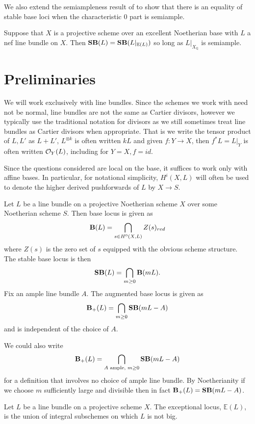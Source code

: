 We also extend the semiampleness result of \cite{witaszek2020keels} to show that there is an equality of stable base loci when the characteristic $0$ part is semiample.
 
 \begin{theorem}
 	Suppose that $X$ is a projective scheme over an excellent Noetherian base with $L$ a nef line bundle on $X$. Then $\SB(L)=\SB(L|_{\mathbb{E}(L)})$ so long as $L|_{X_{\mathbb{Q}}}$ is semiample.
 \end{theorem}


\section{Preliminaries}

We will work exclusively with line bundles. Since the schemes we work with need not be normal, line bundles are not the same as Cartier divisors, however we typically use the traditional notation for divisors as we still sometimes treat line bundles as Cartier divisors when appropriate. That is we write the tensor product of $L,L'$ as $L+L'$, $L^{\otimes k}$ is often written $kL$ and given $f:Y \to X$, then $f^{*}L=L|_{Y}$ is often written $\ox[Y](L)$, including for $Y=X, f=id$. 

Since the questions considered are local on the base, it suffices to work only with affine bases. In particular, for notational simplicity, $H^{i}(X,L)$ will often be used to denote the higher derived pushforwards of $L$ by $X \to S$. 
	
\begin{definition}
	Let $L$ be a line bundle on a projective Noetherian scheme $X$ over some Noetherian scheme $S$. Then base locus is given as 
	$$\BB(L)= \bigcap_{s \in H^{0}(X,L)} Z(s)_{red}$$
	where $Z(s)$ is the zero set of $s$ equipped with the obvious scheme structure. The stable base locus is then
	$$\SB(L)=\bigcap_{m \geq 0}\BB(mL).$$
	Fix an ample line bundle $A$. The augmented base locus is given as 
	$$\BS(L)=\bigcap_{m \geq 0}\SB(mL-A)$$
	and is independent of the choice of $A$.
\end{definition}

We could also write \[\BS(L)= \bigcap_{A \text{ ample, } m \geq 0}\SB(mL-A)\] for a definition that involves no choice of ample line bundle. By Noetherianity if we choose $m$ sufficiently large and divisible then in fact $\BS(L)=\SB(mL-A)$.

 \begin{definition}
	Let $L$ be a line bundle on a projective scheme $X$. The exceptional locus, $\mathbb{E}(L)$, is the union of integral subschemes on which $L$ is not big.
\end{definition}

